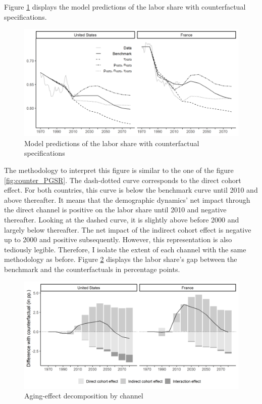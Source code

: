 Figure \ref{fig:counter_DEIE} displays the model predictions of the labor share with counterfactual specifications.
\begin{figure}[tb]
	\centering
	\caption{Model predictions of the labor share with counterfactual specifications}\label{fig:counter_DEIE}
	\includegraphics[width=1\linewidth]{../result/decomposition/counter_DEIE.png}
\end{figure}
The methodology to interpret this figure is similar to the one of the figure \ref{fig:counter_PGSR}. The dash-dotted curve corresponds to the direct cohort effect. For both countries, this curve is below the benchmark curve until 2010 and above thereafter. It means that the demographic dynamics' net impact through the direct channel is positive on the labor share until 2010 and negative thereafter. Looking at the dashed curve, it is slightly above before 2000 and largely below thereafter. The net impact of the indirect cohort effect is negative up to 2000 and positive subsequently. However, this representation is also tediously legible. Therefore, I isolate the extent of each channel with the same methodology as before. Figure \ref{fig:decomp_DEIE} displays the labor share's gap between the benchmark and the counterfactuals in percentage points.
\begin{figure}[tb]
	\centering
		\caption{Aging-effect decomposition by channel}\label{fig:decomp_DEIE}
	\includegraphics[width=1\linewidth]{../result/decomposition/decomp_DEIE.png}
\end{figure}
